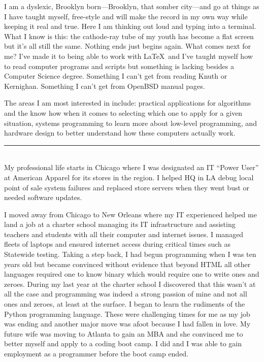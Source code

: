 \documentclass{article}
\begin{document}
I am a dyslexic, Brooklyn born---Brooklyn, that somber city---and go at things as I have taught myself, free-style and will make the record in my own way while keeping it real and true.
Here I am thinking out loud and typing into a terminal. What I know is this: the cathode-ray tube of my youth has become a flat screen but it's all still the same. Nothing ends just begins again. What comes next for me? I've made it to being able to work with \LaTeX\ and I've taught myself how to read computer programs and scripts but something is lacking besides a Computer Science degree. Something I can't get from reading Knuth or Kernighan. Something I can't get from OpenBSD manual pages.

The areas I am most interested in include: practical applications for algorithms and the know how when it comes to selecting which one to apply for a given situation, systems programming to learn more about low-level programming, and hardware design to better understand how these computers actually work.\\

\hrule\
\\

My professional life starts in Chicago where I was designated an IT ``Power User'' at American Apparel for its stores in the region. I helped HQ in LA debug local point of sale system failures and replaced store servers when they went bust or needed software updates.

I moved away from Chicago to New Orleans where my IT experienced helped me land a job at a charter school managing its IT infrastructure and assisting teachers and students with all their computer and internet issues. I managed fleets of laptops and ensured internet access during critical times such as Statewide testing. Taking a step back, I had begun programming when I was ten years old but became convinced without evidence that beyond HTML all other languages required one to know binary which would require one to write ones and zeroes. During my last year at the charter school I discovered that this wasn't at all the case and programming was indeed a strong passion of mine and not all ones and zeroes, at least at the surface. I began to learn the rudiments of the Python programming language. These were challenging times for me as my job was ending and another major move was afoot because I had fallen in love. My future wife was moving to Atlanta to gain an MBA and she convinced me to better myself and apply to a coding boot camp. I did and I was able to gain employment as a programmer before the boot camp ended.
\end{document}
